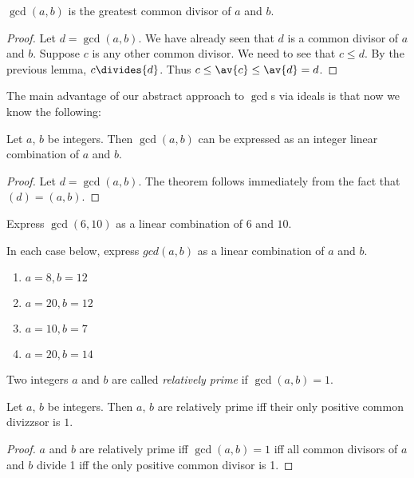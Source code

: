 \documentclass[oneside,12pt]{amsart}
\begin{document}
\begin{lemma}
$\gcd(a,b)$ is the greatest common divisor of $a$ and $b$.
\end{lemma}
\begin{proof}
Let $d=\gcd(a,b)$. We have already seen that $d$ is a common divisor of
$a$ and $b$. Suppose $c$ is any other common divisor. We need to see that
$c\leq d$. By the previous
lemma, $c\divides{d}$. Thus $c\leq\av{c}\leq\av{d}=d$.
\end{proof}

The main advantage of our abstract approach to $\gcd$s via ideals is that
now we know the following:

\begin{theorem}
Let $a$, $b$ be integers. Then $\gcd(a,b)$ can be expressed as an integer
linear combination of $a$ and $b$.
\end{theorem}
\begin{proof}
Let $d=\gcd(a,b)$. The theorem follows immediately from the fact that
$(d) = (a,b)$.
\end{proof}

\begin{in_class_example}
Express $\gcd(6,10)$ as a linear combination of $6$ and $10$.
\end{in_class_example}

\begin{homework}
In each case below, express $gcd(a,b)$ as a linear combination of $a$ and $b$.
\begin{enumerate}
\item $a = 8, b= 12$
\item $a = 20, b= 12$
\item $a=10, b=7$
\item $a=20, b=14$
\end{enumerate}
\end{homework}

\begin{definition}
Two integers $a$ and $b$ are called \emph{relatively prime} if
$\gcd(a,b) = 1$.
\end{definition}

\begin{lemma}
Let $a$, $b$ be integers. Then $a$, $b$ are relatively prime iff
their only positive common divizzsor is $1$.
\end{lemma}
\begin{proof} $a$ and $b$ are relatively prime iff
$\gcd(a,b)=1$ iff all common divisors of $a$ and $b$ divide 1
iff the only positive common divisor is 1.
\end{proof}
\end{document}
